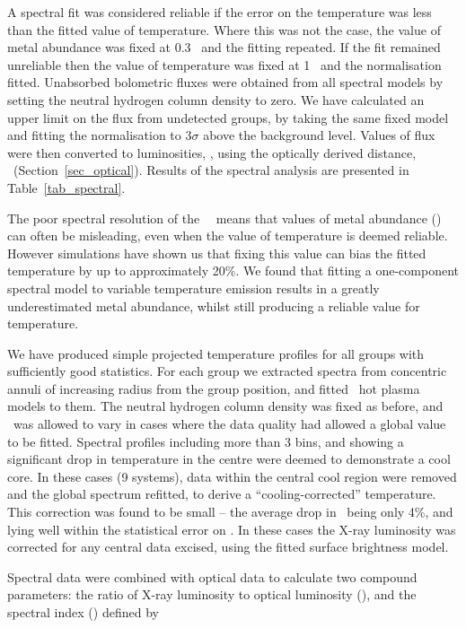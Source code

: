 \documentclass[usenatbib]{mn2e}
\begin{document}
A spectral fit was considered reliable if the error on the temperature was less
than the fitted value of temperature.  Where this was not the case, the value of
metal abundance was fixed at 0.3 \Zsol\ and the fitting repeated.  If the fit
remained unreliable then the value of temperature was fixed at 1 \kev\ and the
normalisation fitted.  Unabsorbed bolometric fluxes were obtained from all
spectral models by setting the neutral hydrogen column density to zero.  We have
calculated an upper limit on the flux from undetected groups, by taking the same
fixed model and fitting the normalisation to 3$\sigma$ above the background
level.  Values of flux were then converted to luminosities, \LX, using the
optically derived distance, \D\ (Section~\ref{sec_optical}). Results of
the spectral analysis are presented in Table~\ref{tab_spectral}.

The poor spectral resolution of the \ROSAT\ \PSPC\ means that values of metal
abundance (\Z) can often be misleading, even when the value of temperature is
deemed reliable.  However simulations have shown us that fixing this value can
bias the fitted temperature by up to approximately 20\%.  We found that fitting a
one-component spectral model to variable temperature emission results in a
greatly underestimated metal abundance, whilst still producing a reliable value
for temperature.

We have produced simple projected temperature profiles for all groups with
sufficiently good statistics.  For each group we extracted spectra from
concentric annuli of increasing radius from the group position, and fitted \MEKAL\
hot plasma models to them.  The neutral hydrogen column density was fixed as
before, and \Z\ was allowed to vary in cases where the data quality had allowed a
global value to be fitted.  Spectral profiles including more than 3 bins, and
showing a significant drop in temperature in the centre were deemed to
demonstrate a cool core. In these cases (9 systems), data within the central cool
region were removed and the global spectrum refitted, to derive a
``cooling-corrected'' temperature.  This correction was found to be small -- the
average drop in \TX\ being only 4\%,  and lying well within the statistical
error on \TX.  In these cases the X-ray luminosity was corrected for any central
data excised, using the fitted surface brightness model.

Spectral data were combined with optical data to calculate two compound
parameters:  the ratio of X-ray luminosity to optical luminosity (\LXpLB), and the
spectral index (\betaspec) defined by
\end{document}

